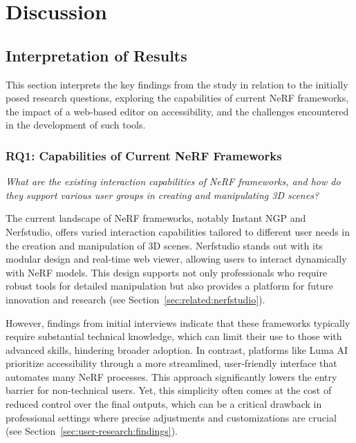 %
\chapter{Discussion}
\label{sec:discussion}

\section{Interpretation of Results}
\label{sec:discussion:results}

This section interprets the key findings from the study in relation to the initially posed research questions, exploring the capabilities of current NeRF frameworks, the impact of a web-based editor on accessibility, and the challenges encountered in the development of such tools.

\subsection*{RQ1: Capabilities of Current NeRF Frameworks}

\emph{What are the existing interaction capabilities of NeRF frameworks, and how do they support various user groups in creating and manipulating 3D scenes?}

The current landscape of NeRF frameworks, notably Instant NGP and Nerfstudio, offers varied interaction capabilities tailored to different user needs in the creation and manipulation of 3D scenes.
Nerfstudio stands out with its modular design and real-time web viewer, allowing users to interact dynamically with NeRF models.
This design supports not only professionals who require robust tools for detailed manipulation but also provides a platform for future innovation and research (see Section~\ref{sec:related:nerfstudio}).

However, findings from initial interviews indicate that these frameworks typically require substantial technical knowledge, which can limit their use to those with advanced skills, hindering broader adoption.
In contrast, platforms like Luma AI prioritize accessibility through a more streamlined, user-friendly interface that automates many NeRF processes.
This approach significantly lowers the entry barrier for non-technical users.
Yet, this simplicity often comes at the cost of reduced control over the final outputs, which can be a critical drawback in professional settings where precise adjustments and customizations are crucial (see Section~\ref{sec:user-research:findings}).

